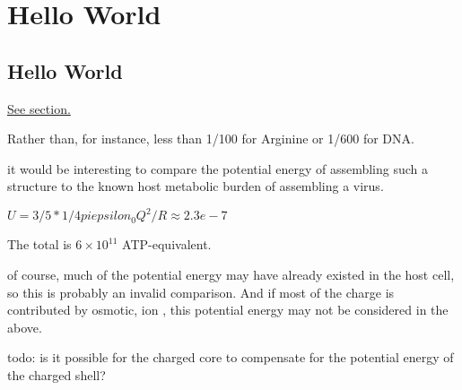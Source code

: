\documentclass[paper.tex]{subfiles}
\begin{document}
\section{Hello World}
\subsection{Hello World}
\label{sec:hello}


\hyperref[sec:hello]{See section.}


Rather than, for instance, less than 1/100 for Arginine or 1/600 for DNA.



it would be interesting to compare the potential energy of assembling such a structure to the known host metabolic burden of assembling a virus.


$U = 3/5 * 1/4 pi epsilon_0 Q^2 / R \approx 2.3e-7 $

The total is $6 \times 10^11$ ATP-equivalent.


of course, much of the potential energy may have already existed in the host cell, so this is probably an invalid comparison. And if most of the charge is contributed by osmotic, ion , this potential energy may not be considered in the above. 

todo: is it possible for the charged core to compensate for the potential energy of the charged shell?
\end{document}
